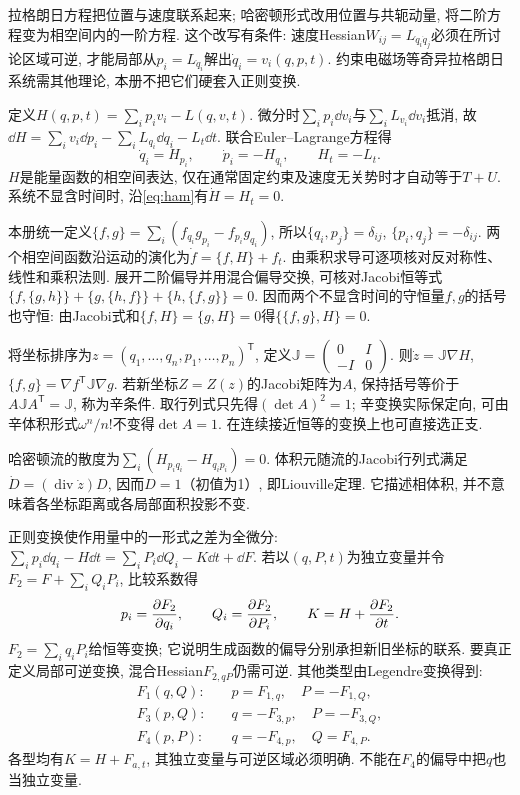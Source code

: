 拉格朗日方程把位置与速度联系起来; 哈密顿形式改用位置与共轭动量, 将二阶方程变为相空间内的一阶方程. 这个改写有条件: 速度Hessian$W_{ij}=L_{\dot q_i\dot q_j}$必须在所讨论区域可逆, 才能局部从$p_i=L_{\dot q_i}$解出$\dot q_i=v_i(q,p,t)$. 约束电磁场等奇异拉格朗日系统需其他理论, 本册不把它们硬套入正则变换.

定义$H(q,p,t)=\sum_ip_iv_i-L(q,v,t)$. 微分时$\sum_ip_i\dd v_i$与$\sum_iL_{v_i}\dd v_i$抵消, 故$\dd H=\sum_iv_i\dd p_i-\sum_iL_{q_i}\dd q_i-L_t\dd t$. 联合Euler--Lagrange方程得
\begin{equation}\label{eq:ham}
\dot q_i=H_{p_i},\qquad\dot p_i=-H_{q_i},\qquad H_t=-L_t.
\end{equation}
$H$是能量函数的相空间表达, 仅在通常固定约束及速度无关势时才自动等于$T+U$. 系统不显含时间时, 沿\eqref{eq:ham}有$\dot H=H_t=0$.

本册统一定义$\{f,g\}=\sum_i(f_{q_i}g_{p_i}-f_{p_i}g_{q_i})$, 所以$\{q_i,p_j\}=\delta_{ij}$, $\{p_i,q_j\}=-\delta_{ij}$. 两个相空间函数沿运动的演化为$\dot f=\{f,H\}+f_t$. 由乘积求导可逐项核对反对称性、线性和乘积法则. 展开二阶偏导并用混合偏导交换, 可核对Jacobi恒等式$\{f,\{g,h\}\}+\{g,\{h,f\}\}+\{h,\{f,g\}\}=0$. 因而两个不显含时间的守恒量$f,g$的括号也守恒: 由Jacobi式和$\{f,H\}=\{g,H\}=0$得$\{\{f,g\},H\}=0$.

将坐标排序为$z=(q_1,\ldots,q_n,p_1,\ldots,p_n)^{\mathsf T}$, 定义$\mathbb J=\left(\begin{smallmatrix}0&I\\-I&0\end{smallmatrix}\right)$. 则$\dot z=\mathbb J\nabla H$, $\{f,g\}=\nabla f^{\mathsf T}\mathbb J\nabla g$. 若新坐标$Z=Z(z)$的Jacobi矩阵为$A$, 保持括号等价于$A\mathbb JA^{\mathsf T}=\mathbb J$, 称为辛条件. 取行列式只先得$(\det A)^2=1$; 辛变换实际保定向, 可由辛体积形式$\omega^n/n!$不变得$\det A=1$. 在连续接近恒等的变换上也可直接选正支.

哈密顿流的散度为$\sum_i(H_{p_iq_i}-H_{q_ip_i})=0$. 体积元随流的Jacobi行列式满足$\dot D=(\operatorname{div}\dot z)D$, 因而$D=1$（初值为1）, 即Liouville定理. 它描述相体积, 并不意味着各坐标距离或各局部面积投影不变.

正则变换使作用量中的一形式之差为全微分:
$\sum_ip_i\dd q_i-H\dd t=\sum_iP_i\dd Q_i-K\dd t+\dd F$. 若以$(q,P,t)$为独立变量并令$F_2=F+\sum_iQ_iP_i$, 比较系数得
\[
p_i=\frac{\partial F_2}{\partial q_i},\qquad Q_i=\frac{\partial F_2}{\partial P_i},\qquad
K=H+\frac{\partial F_2}{\partial t}.
\]
$F_2=\sum_iq_iP_i$给恒等变换; 它说明生成函数的偏导分别承担新旧坐标的联系. 要真正定义局部可逆变换, 混合Hessian$F_{2,qP}$仍需可逆. 其他类型由Legendre变换得到:
\begin{align*}
F_1(q,Q):&\quad p=F_{1,q},\quad P=-F_{1,Q},\\
F_3(p,Q):&\quad q=-F_{3,p},\quad P=-F_{3,Q},\\
F_4(p,P):&\quad q=-F_{4,p},\quad Q=F_{4,P}.
\end{align*}
各型均有$K=H+F_{a,t}$, 其独立变量与可逆区域必须明确. 不能在$F_4$的偏导中把$q$也当独立变量.

